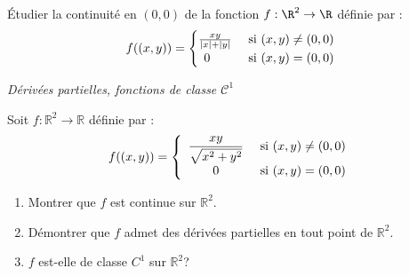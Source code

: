 \documentclass[a4paper,10pt]{report}
\begin{document}
\begin{Exa} Étudier la continuité en $(0,0)$ de la fonction $f : \R^{2} \rightarrow \R$ définie par :
  \[
  f((x,y)) =
  \begin{cases}
    \frac{xy}{\vert x \vert + \vert y \vert} & \hbox{ si } (x,y) \neq (0,0) \\
    \, \; 0 & \hbox{ si } (x,y)=(0,0)
  \end{cases}
  \]
\end{Exa}


\medskip

\begin{center}
\textit{{ {\large Dérivées partielles, fonctions de classe $\mathcal{C}^1$}}}
\end{center}

\medskip

\begin{Exa} Soit $f : \mathbb{R}^2 \rightarrow \mathbb{R}$ définie par :
$$ f((x,y)) = \left\lbrace \begin{array}{cl}
\dfrac{xy}{\sqrt{x^{2}+y^{2}}} & \hbox{ si } (x,y) \neq (0,0) \\
0 & \hbox{ si } (x,y) = (0,0)\\
\end{array}\right.$$

\begin{enumerate}
\item Montrer que $f$ est continue sur $\mathbb{R}^{2}$.
\item Démontrer que $f$ admet des d\'{e}riv\'{e}es partielles en tout point de $\mathbb{R}^{2}$.
\item $f$ est-elle de classe $C^{1}$ sur $\mathbb{R}^2$?
\end{enumerate}
\end{Exa}
\end{document}
